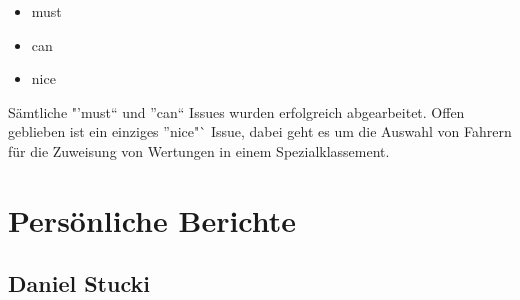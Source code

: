 \begin{itemize}
\item must
\item can
\item nice
\end{itemize}

Sämtliche "'must"` und "'can"` Issues wurden erfolgreich abgearbeitet. Offen geblieben ist ein einziges "'nice"` Issue, dabei geht es um die Auswahl von Fahrern für die Zuweisung von Wertungen in einem Spezialklassement.

\section{Persönliche Berichte}

\subsection{Daniel Stucki}

